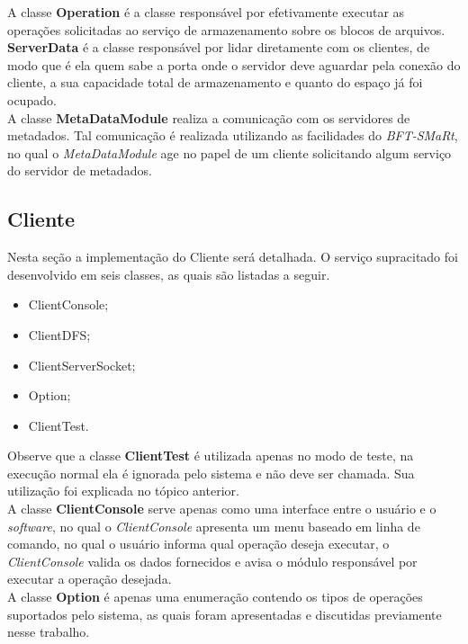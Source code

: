 A classe \textbf{Operation} é a classe responsável por efetivamente executar as operações solicitadas ao serviço de armazenamento sobre os blocos de arquivos.
\\

\textbf{ServerData} é a classe responsável por lidar diretamente com os clientes, de modo que é ela quem sabe a porta onde o servidor deve aguardar pela conexão do cliente, a sua capacidade total de armazenamento e quanto do espaço já foi ocupado.
\\

A classe \textbf{MetaDataModule} realiza a comunicação com os servidores de metadados. Tal comunicação é realizada utilizando as facilidades do \textit{BFT-SMaRt}, no qual o \textit{MetaDataModule} age no papel de um cliente solicitando algum serviço do servidor de metadados.
\\

\subsection{Cliente}
Nesta seção a implementação do Cliente será detalhada. O serviço supracitado foi desenvolvido em seis classes, as quais são listadas a seguir.
\\

\begin{itemize}
	\item ClientConsole;
	\item ClientDFS;
	\item ClientServerSocket;
	\item Option;
	\item ClientTest.
\end{itemize}

Observe que a classe \textbf{ClientTest} é utilizada apenas no modo de teste, na execução normal ela é ignorada pelo sistema e não deve ser chamada. Sua utilização foi explicada no tópico anterior.
\\

A classe \textbf{ClientConsole} serve apenas como uma interface entre o usuário e o \textit{software}, no qual o \textit{ClientConsole} apresenta um menu baseado em linha de comando, no qual o usuário informa qual operação deseja executar, o \textit{ClientConsole} valida os dados fornecidos e avisa o módulo responsável por executar a operação desejada.
\\

A classe \textbf{Option} é apenas uma enumeração contendo os tipos de operações suportados pelo sistema, as quais foram apresentadas e discutidas previamente nesse trabalho.
\\

